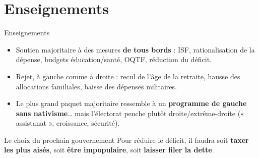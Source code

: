 \documentclass[11pt,aspectratio=169,french]{beamer}
\begin{document}

\section{Enseignements}

\begin{frame}{Enseignements}
  \begin{itemize}
    \item Soutien majoritaire à des mesures \textbf{de tous bords} : ISF, rationalisation de la dépense,
          budgets éducation/santé, OQTF, réduction du déficit.
    \item Rejet, à gauche comme à droite : recul de l'âge de la retraite, hausse des allocations
          familiales, baisse des dépenses militaires.
    \item Le plus grand paquet majoritaire ressemble à un \textbf{programme de gauche sans nativisme}\dots
          mais l'électorat penche plutôt droite/extrême-droite (« assistanat », croissance, sécurité).
  \end{itemize}
  \vfill
  \begin{alertblock}{Le choix du prochain gouvernement}
    Pour réduire le déficit, il faudra soit \textbf{taxer les plus aisés}, soit \textbf{être impopulaire},
    soit \textbf{laisser filer la dette}.
  \end{alertblock}
\end{frame}
\end{document}
